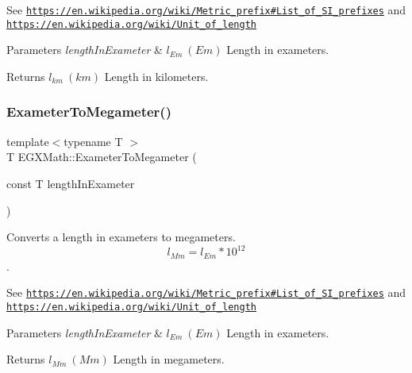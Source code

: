 See \href{https://en.wikipedia.org/wiki/Metric_prefix#List_of_SI_prefixes}{\tt https\+://en.\+wikipedia.\+org/wiki/\+Metric\+\_\+prefix\#\+List\+\_\+of\+\_\+\+S\+I\+\_\+prefixes} and \href{https://en.wikipedia.org/wiki/Unit_of_length}{\tt https\+://en.\+wikipedia.\+org/wiki/\+Unit\+\_\+of\+\_\+length} 
\begin{DoxyParams}{Parameters}
{\em length\+In\+Exameter} & $ l_{Em}\ (Em)$ Length in exameters. \\
\hline
\end{DoxyParams}
\begin{DoxyReturn}{Returns}
$ l_{km}\ (km)$ Length in kilometers. 
\end{DoxyReturn}
\mbox{\label{group___e_g_x_math-_conversions-_length_conversions-_s_i-_exameter-_s_i_gac3451985da098b2668e48c30468efd83}} 
\subsubsection{\texorpdfstring{Exameter\+To\+Megameter()}{ExameterToMegameter()}}
{\footnotesize\ttfamily template$<$typename T $>$ \\
T E\+G\+X\+Math\+::\+Exameter\+To\+Megameter (\begin{DoxyParamCaption}\item[{const T}]{length\+In\+Exameter }\end{DoxyParamCaption})}



Converts a length in exameters to megameters. \[ l_{Mm}=l_{Em} * 10^{12} \]. 

See \href{https://en.wikipedia.org/wiki/Metric_prefix#List_of_SI_prefixes}{\tt https\+://en.\+wikipedia.\+org/wiki/\+Metric\+\_\+prefix\#\+List\+\_\+of\+\_\+\+S\+I\+\_\+prefixes} and \href{https://en.wikipedia.org/wiki/Unit_of_length}{\tt https\+://en.\+wikipedia.\+org/wiki/\+Unit\+\_\+of\+\_\+length} 
\begin{DoxyParams}{Parameters}
{\em length\+In\+Exameter} & $ l_{Em}\ (Em)$ Length in exameters. \\
\hline
\end{DoxyParams}
\begin{DoxyReturn}{Returns}
$ l_{Mm}\ (Mm)$ Length in megameters. 
\end{DoxyReturn}
\mbox{\label{group___e_g_x_math-_conversions-_length_conversions-_s_i-_exameter-_s_i_ga367c71c371f48790004a1de30a59f2a4}} 
